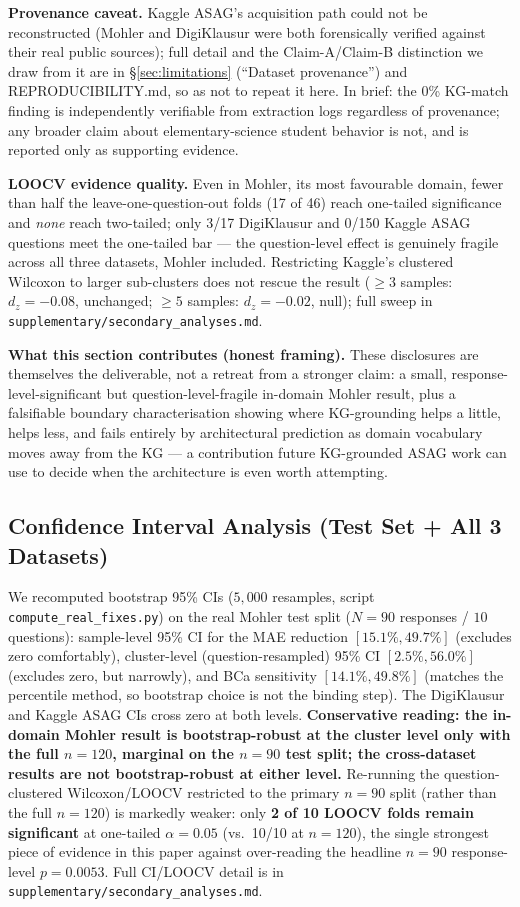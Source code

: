 \documentclass[conference]{IEEEtran}
\begin{document}
\textbf{Provenance caveat.} Kaggle ASAG's acquisition path could not
be reconstructed (Mohler and DigiKlausur were both forensically
verified against their real public sources); full detail and the
Claim-A/Claim-B distinction we draw from it are in
\S\ref{sec:limitations} (``Dataset provenance'') and
REPRODUCIBILITY.md, so as not to repeat it here. In brief: the 0\%
KG-match finding is independently verifiable from extraction logs
regardless of provenance; any broader claim about elementary-science
student behavior is not, and is reported only as supporting evidence.

\textbf{LOOCV evidence quality.} Even in Mohler, its most favourable
domain, fewer than half the leave-one-question-out folds (17 of 46)
reach one-tailed significance and \emph{none} reach two-tailed; only
3/17 DigiKlausur and 0/150 Kaggle ASAG questions meet the one-tailed
bar --- the question-level effect is genuinely fragile across all
three datasets, Mohler included. Restricting Kaggle's clustered
Wilcoxon to larger sub-clusters does not rescue the result ($\geq 3$
samples: $d_z=-0.08$, unchanged; $\geq 5$ samples: $d_z=-0.02$, null);
full sweep in \texttt{supplementary/secondary\_analyses.md}.

\textbf{What this section contributes (honest framing).} These
disclosures are themselves the deliverable, not a retreat from a
stronger claim: a small, response-level-significant but
question-level-fragile in-domain Mohler result, plus a falsifiable
boundary characterisation showing where KG-grounding helps a little,
helps less, and fails entirely by architectural prediction as domain
vocabulary moves away from the KG --- a contribution future
KG-grounded ASAG work can use to decide when the architecture is even
worth attempting.

\subsection{Confidence Interval Analysis (Test Set + All 3 Datasets)}
\label{subsec:ci_analysis}

We recomputed bootstrap 95\% CIs ($5{,}000$ resamples, script
\texttt{compute\_real\_fixes.py}) on the real Mohler test split
($N=90$ responses / $10$ questions): sample-level 95\% CI for the MAE
reduction $[15.1\%, 49.7\%]$ (excludes zero comfortably), cluster-level
(question-resampled) 95\% CI $[2.5\%, 56.0\%]$ (excludes zero, but
narrowly), and BCa sensitivity $[14.1\%, 49.8\%]$ (matches the
percentile method, so bootstrap choice is not the binding step). The
DigiKlausur and Kaggle ASAG CIs cross zero at both levels.
\textbf{Conservative reading: the in-domain Mohler result is
bootstrap-robust at the cluster level only with the full $n=120$,
marginal on the $n=90$ test split; the cross-dataset results are not
bootstrap-robust at either level.} Re-running the question-clustered
Wilcoxon/LOOCV restricted to the primary $n=90$ split (rather than the
full $n=120$) is markedly weaker: only \textbf{2 of 10 LOOCV folds
remain significant} at one-tailed $\alpha=0.05$ (vs.\ 10/10 at
$n=120$), the single strongest piece of evidence in this paper against
over-reading the headline $n=90$ response-level $p=0.0053$. Full
CI/LOOCV detail is in \texttt{supplementary/secondary\_analyses.md}.
\end{document}
